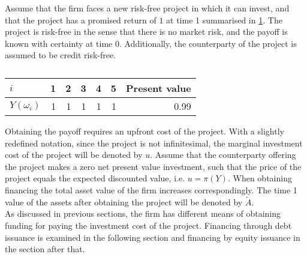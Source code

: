 \documentclass[main.tex]{subfiles}
\begin{document}
    Assume that the firm faces a new risk-free project in which it can invest,
    and that the project has a promised return of $\num{1}$ at time 1 summarised in \cref{tbl:single-period-simple-derivative-payoff}.
    The project is risk-free in the sense that there is no market risk,
    and the payoff is known with certainty at time 0.
    Additionally, the counterparty of the project is assumed to be credit risk-free.
        \begin{table}[H]
            \centering
            \begin{tabular}{l|rrrrr||r}
                $i$ & 1 & 2 & 3 & 4 & 5 & Present value\\
                \hline
                $Y(\omega_{i})$ & 
                    \num{1} & \num{1} & \num{1} & \num{1} & \num{1} & \num{0.99}
            \end{tabular}
            \caption{}
            \label{tbl:single-period-simple-derivative-payoff}
        \end{table}
    Obtaining the payoff requires an upfront cost of the project.
    With a slightly redefined notation, since the project is not infinitesimal,
    the marginal investment cost of the project will be denoted by $u$.
    Assume that the counterparty offering the project makes a zero net present value investment, 
    such that the price of the project equals the expected discounted value, i.e. $u = \pi(Y)$.
    When obtaining financing the total asset value of the firm increases correspondingly.
    The time 1 value of the assets after obtaining the project will be denoted by $\tilde{A}$.
    \\
    As discussed in previous sections, the firm has different means of obtaining funding
    for paying the investment cost of the project.
    Financing through debt issuance is examined in the following section 
    and financing by equity issuance in the section after that.
\end{document}
